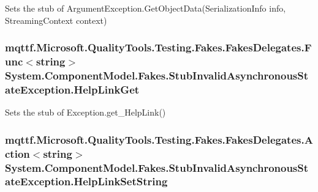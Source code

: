 Sets the stub of Argument\-Exception.\-Get\-Object\-Data(\-Serialization\-Info info, Streaming\-Context context)

\hypertarget{class_system_1_1_component_model_1_1_fakes_1_1_stub_invalid_asynchronous_state_exception_a48f4132ca6c70d604592b9146d0927ca}{
\subsubsection[{Help\-Link\-Get}]{\setlength{\rightskip}{0pt plus 5cm}mqttf.\-Microsoft.\-Quality\-Tools.\-Testing.\-Fakes.\-Fakes\-Delegates.\-Func$<$string$>$ System.\-Component\-Model.\-Fakes.\-Stub\-Invalid\-Asynchronous\-State\-Exception.\-Help\-Link\-Get}}\label{class_system_1_1_component_model_1_1_fakes_1_1_stub_invalid_asynchronous_state_exception_a48f4132ca6c70d604592b9146d0927ca}


Sets the stub of Exception.\-get\-\_\-\-Help\-Link()

\hypertarget{class_system_1_1_component_model_1_1_fakes_1_1_stub_invalid_asynchronous_state_exception_a49a5253eb875f6dd9d8609a4d1064ccc}{
\subsubsection[{Help\-Link\-Set\-String}]{\setlength{\rightskip}{0pt plus 5cm}mqttf.\-Microsoft.\-Quality\-Tools.\-Testing.\-Fakes.\-Fakes\-Delegates.\-Action$<$string$>$ System.\-Component\-Model.\-Fakes.\-Stub\-Invalid\-Asynchronous\-State\-Exception.\-Help\-Link\-Set\-String}}\label{class_system_1_1_component_model_1_1_fakes_1_1_stub_invalid_asynchronous_state_exception_a49a5253eb875f6dd9d8609a4d1064ccc}


